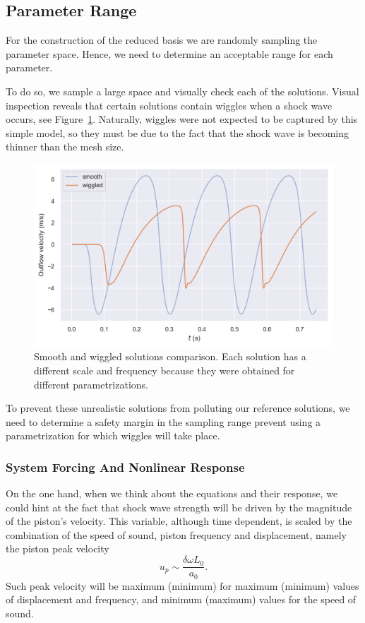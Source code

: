 \documentclass[../../thesis.tex]{subfiles}
\begin{document}
\subsection{Parameter Range}
For the construction of the reduced basis we are randomly sampling the parameter space.
Hence, we need to determine an acceptable range for each parameter.

To do so, we sample a large space and visually check each of the solutions.
Visual inspection reveals that certain solutions contain wiggles when a shock wave occurs, see Figure~\ref{fig:smooth_vs_wiggled}.
Naturally, wiggles were not expected to be captured by this simple model, 
so they must be due to the fact that the shock wave is becoming thinner than the mesh size.

\begin{figure}[h]
    \centering
    \includegraphics[width=1\columnwidth]{research_project/piston/figures/wiggles/smooth_vs_wiggled.png}
    \caption{Smooth and wiggled solutions comparison.
    Each solution has a different scale and frequency because they were obtained for different parametrizations.}
    \label{fig:smooth_vs_wiggled}
\end{figure}
To prevent these unrealistic solutions from polluting our reference solutions, we
need to determine a safety margin in the sampling range prevent using a parametrization for which wiggles will take place.

\subsubsection{System Forcing And Nonlinear Response}
\label{sec:fom_calibration_system_forcing}
On the one hand, when we think about the equations and their response, we could hint at the fact that shock wave strength will be driven by the magnitude of the piston's velocity.
This variable, although time dependent, is scaled by the combination of the speed of sound,
piston frequency and displacement, 
namely the piston peak velocity
\begin{equation}
    u_p \sim \frac{\delta \omega L_0}{a_0}.
\end{equation}
Such peak velocity will be maximum (minimum) for maximum (minimum) values of displacement and frequency, and minimum (maximum) values for the speed of sound.
\end{document}
